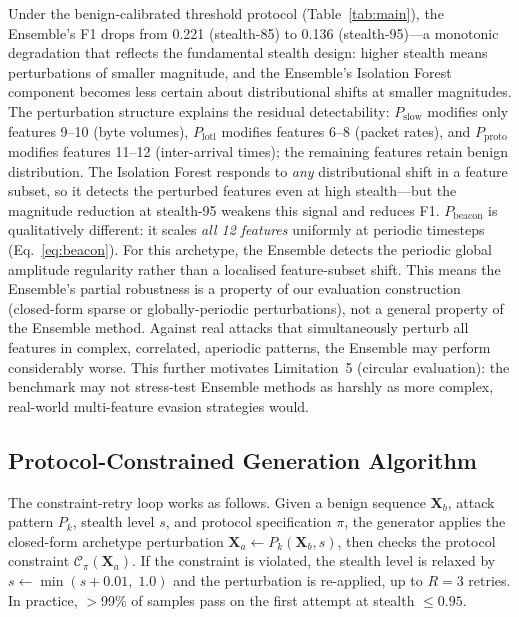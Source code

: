 Under the benign-calibrated threshold protocol (Table~\ref{tab:main}), the Ensemble's
F1 drops from 0.221 (stealth-85) to 0.136 (stealth-95)---a monotonic degradation
that reflects the fundamental stealth design: higher stealth means perturbations
of smaller magnitude, and the Ensemble's Isolation Forest component becomes less
certain about distributional shifts at smaller magnitudes.
The perturbation structure explains the residual detectability:
$P_{\text{slow}}$ modifies only features 9--10 (byte volumes),
$P_{\text{lotl}}$ modifies features 6--8 (packet rates), and
$P_{\text{proto}}$ modifies features 11--12 (inter-arrival times);
the remaining features retain benign distribution.
The Isolation Forest responds to \emph{any} distributional shift in a feature subset,
so it detects the perturbed features even at high stealth---but the magnitude reduction
at stealth-95 weakens this signal and reduces F1.
$P_{\text{beacon}}$ is qualitatively different: it scales \emph{all 12 features}
uniformly at periodic timesteps (Eq.~\ref{eq:beacon}).
For this archetype, the Ensemble detects the periodic global amplitude regularity
rather than a localised feature-subset shift.
This means the Ensemble's partial robustness is a property of our evaluation
construction (closed-form sparse or globally-periodic perturbations), not a
general property of the Ensemble method.
Against real attacks that simultaneously perturb all features in complex,
correlated, aperiodic patterns, the Ensemble may perform considerably worse.
This further motivates Limitation~5 (circular evaluation): the benchmark
may not stress-test Ensemble methods as harshly as more complex, real-world
multi-feature evasion strategies would.

\subsection{Protocol-Constrained Generation Algorithm}
\label{app:algorithm}

The constraint-retry loop works as follows.
Given a benign sequence $\mathbf{X}_b$, attack pattern $P_k$, stealth
level $s$, and protocol specification $\pi$, the generator applies the
closed-form archetype perturbation
$\mathbf{X}_a \leftarrow P_k(\mathbf{X}_b, s)$, then checks the protocol
constraint $\mathcal{C}_\pi(\mathbf{X}_a)$.
If the constraint is violated, the stealth level is relaxed by
$s \leftarrow \min(s + 0.01,\; 1.0)$ and the perturbation is re-applied,
up to $R{=}3$ retries.
In practice, $>$99\% of samples pass on the first attempt at
stealth $\leq 0.95$.\label{alg:hng}

